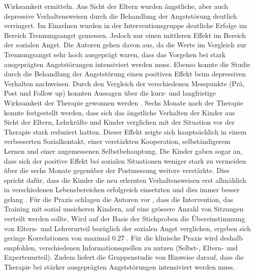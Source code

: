 Wirksamkeit ermitteln. Aus Sicht der Eltern wurden ängstliche, aber auch depressive Verhaltensweisen durch die Behandlung der Angststörung deutlich verringert. Im Einzelnen wurden in der Interventionsgruppe deutliche Erfolge im Bereich Trennungsangst gemessen. Jedoch nur einen mittleren Effekt im Bereich der sozialen Angst. Die Autoren gehen davon aus, da die Werte im Vergleich zur Trennungsangst sehr hoch ausgeprägt waren, dass das Vorgehen bei stark ausgeprägten Angststörungen intensiviert werden muss. Ebenso konnte die Studie durch die Behandlung der Angststörung einen positiven Effekt beim depressiven Verhalten nachweisen. Durch den Vergleich der verschiedenen Messpunkte (Prä, Post und Follow up) konnten Aussagen über die kurz- und langfristige Wirksamkeit der Therapie gewonnen werden \cite{Moller:2011}. Sechs Monate nach der Therapie konnte festgestellt werden, dass sich das ängstliche Verhalten der Kinder aus Sicht der Eltern, Lehrkräfte und Kinder verglichen mit der Situation vor der Therapie stark reduziert hatten. Dieser Effekt zeigte sich hauptsächlich in einem verbesserten Sozialkontakt, einer verstärkten Kooperation, selbständigerem Lernen und einer angemessenen Selbstbehauptung. Die Kinder gaben sogar an, dass sich der positive Effekt bei sozialen Situationen weniger stark zu vermeiden über die sechs Monate gegenüber der Postmessung weitere verstärkte. Dies spricht dafür, dass die Kinder die neu erlernten Verhaltensweisen erst allmählich in verschiedenen Lebensbereichen erfolgreich einsetzten und dies immer besser gelang \cite{Moller:2011}. Für die Praxis schlagen die Autoren vor \cite{Petermann:2015}, dass die Intervention, das Training mit sozial unsicheren Kindern, auf eine grössere Anzahl von Sitzungen verteilt werden sollte. Wird auf der Basis der Stichproben die Übereinstimmung von Eltern- und Lehrerurteil bezüglich der sozialen Angst verglichen, ergeben sich geringe Korrelationen von maximal 0.27 \cite{Moller:2011}. Für die klinische Praxis wird deshalb empfohlen, verschiedenen Informationsquellen zu nutzen (Selbst-, Eltern- und Expertenurteil). Zudem liefert die Gruppenstudie von  Hinweise darauf, dass die Therapie bei stärker ausgeprägten Angststörungen intensiviert werden muss.







